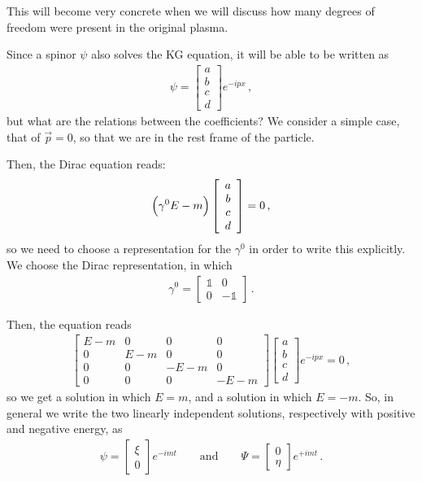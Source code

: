 \documentclass[main.tex]{subfiles}
\begin{document}
This will become very concrete when we will discuss how many degrees of freedom were present in the original plasma. 

Since a spinor \(\psi \) also solves the KG equation, it will be able to be written as 
%
\begin{align}
\psi = \left[\begin{array}{c}
a \\ 
b \\ 
c \\ 
d
\end{array}\right] e^{-i px}
\,,
\end{align}
%
but what are the relations between the coefficients? 
We consider a simple case, that of \(\vec{p} =0\), so that we are in the rest frame of the particle. 

Then, the Dirac equation reads: 
%
\begin{align}
\qty(\gamma^{0}E - m ) \left[\begin{array}{c}
a \\ 
b \\ 
c \\ 
d
\end{array}\right]=0
\,,
\end{align}
%
so we need to choose a representation for the \(\gamma^{0}\) in order to write this explicitly. We choose the Dirac representation, in which 
%
\begin{align}
\gamma^{0} = \left[\begin{array}{cc}
\mathbb{1} & 0 \\ 
0 & -\mathbb{1}
\end{array}\right]
\,.
\end{align}

Then, the equation reads 
%
\begin{align}
\left[\begin{array}{cccc}
E-m & 0 & 0 & 0 \\ 
0 & E-m & 0 & 0 \\ 
0 & 0 & -E-m & 0 \\ 
0 & 0 & 0 & -E-m
\end{array}\right] 
\left[\begin{array}{c}
a \\ 
b \\ 
c \\ 
d
\end{array}\right] e^{-ipx}
= 0
\,,
\end{align}
%
so we get a solution in which \(E=m\), and a solution in which \(E = -m \). So, in general we write the two linearly independent  solutions, respectively with positive and negative energy, as 
%
\begin{align}
\psi = \left[\begin{array}{c}
\xi  \\ 
0
\end{array}\right] e^{-imt}
\qquad \text{and} \qquad
\Psi = \left[\begin{array}{c}
0 \\ 
\eta 
\end{array}\right] e^{+imt}
\,.
\end{align}
\end{document}

